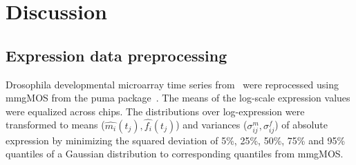 \documentclass{pnastwo}
\begin{document}
\begin{article}
\section{Discussion}

\begin{materials}
  \section{Expression data preprocessing} Drosophila developmental
  microarray time series from~\cite{Tomancak2002} were reprocessed
  using mmgMOS from the puma package~\cite{Pearson2009}.  The means of
  the log-scale expression values were equalized across chips.  The
  distributions over log-expression were transformed to means
  ($\hat{m_i}(t_j), \hat{f_i}(t_j)$) and variances ($\sigma^m_{ij},
  \sigma^f_{ij}$) of absolute expression by minimizing the squared
  deviation of 5\%, 25\%, 50\%, 75\% and 95\% quantiles of a Gaussian
  distribution to corresponding quantiles from mmgMOS.


\end{materials}
\end{article}
\end{document}
